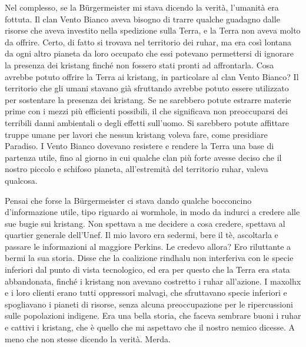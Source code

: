 Nel complesso, se la Bürgermeister mi stava dicendo la verità, l'umanità
era fottuta. Il clan Vento Bianco aveva bisogno di trarre qualche
guadagno dalle risorse che aveva investito nella spedizione sulla Terra,
e la Terra non aveva molto da offrire. Certo, di fatto si trovava nel
territorio dei ruhar, ma era così lontana da ogni altro pianeta da loro
occupato che essi potevano permettersi di ignorare la presenza dei
kristang finché non fossero stati pronti ad affrontarla. Cosa avrebbe
potuto offrire la Terra ai kristang, in particolare al clan Vento
Bianco? Il territorio che gli umani stavano già sfruttando avrebbe
potuto essere utilizzato per sostentare la presenza dei kristang. Se ne
sarebbero potute estrarre materie prime con i mezzi più efficienti
possibili, il che significava non preoccuparsi dei terribili danni
ambientali o degli effetti sull'uomo. Si sarebbero potute affittare
truppe umane per lavori che nessun kristang voleva fare, come presidiare
Paradiso. I Vento Bianco dovevano resistere e rendere la Terra una base
di partenza utile, fino al giorno in cui qualche clan più forte avesse
deciso che il nostro piccolo e schifoso pianeta, all'estremità del
territorio ruhar, valeva qualcosa.

Pensai che forse la Bürgermeister ci stava dando qualche bocconcino
d'informazione utile, tipo riguardo ai wormhole, in modo da indurci a
credere alle sue bugie sui kristang. Non spettava a me decidere a cosa
credere, spettava al quartier generale dell'Unef. Il mio lavoro era
sedermi, bere il tè, ascoltarla e passare le informazioni al maggiore
Perkins. Le credevo allora? Ero riluttante a bermi la sua storia. Disse
che la coalizione rindhalu non interferiva con le specie inferiori dal
punto di vista tecnologico, ed era per questo che la Terra era stata
abbandonata, finché i kristang non avevano costretto i ruhar all'azione.
I maxolhx e i loro clienti erano tutti oppressori malvagi, che
sfruttavano specie inferiori e spogliavano i pianeti di risorse, senza
alcuna preoccupazione per le ripercussioni sulle popolazioni indigene.
Era una bella storia, che faceva sembrare buoni i ruhar e cattivi i
kristang, che è quello che mi aspettavo che il nostro nemico dicesse. A
meno che non stesse dicendo la verità. Merda.

\hfill\break

